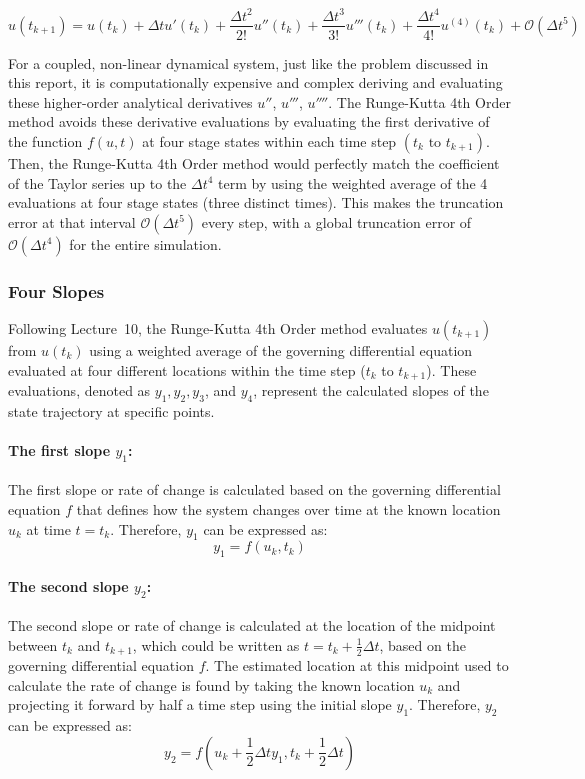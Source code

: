 \documentclass{article}
\begin{document}
\[u(t_{k+1}) = u(t_k) + \Delta t u'(t_k) + \frac{\Delta t^2}{2!} u''(t_k) + \frac{\Delta t^3}{3!} u'''(t_k) + \frac{\Delta t^4}{4!} u^{(4)}(t_k) + \mathcal{O}(\Delta t^5)\]

For a coupled, non-linear dynamical system, just like the problem discussed in this report, it is computationally expensive and complex deriving and evaluating these higher-order analytical derivatives $u''$, $u'''$, $u''''$. The Runge-Kutta 4th Order method avoids these derivative evaluations by evaluating the first derivative of the function $f(u,t)$ at four stage states within each time step $\left(t_{k} \text{ to } t_{k+1} \right)$. Then, the Runge-Kutta 4th Order method would perfectly match the coefficient of the Taylor series up to the $\Delta t^4$ term by using the weighted average of the 4 evaluations at four stage states (three distinct times). This makes the truncation error at that interval $\mathcal{O}(\Delta t^5)$ every step, with a global truncation error of $\mathcal{O}(\Delta t^4)$ for the entire simulation.

\subsubsection{Four Slopes}%
Following Lecture~10, the Runge-Kutta 4th Order method evaluates $u(t_{k+1})$ from $u(t_k)$ using a weighted average of the governing differential equation evaluated at four different locations within the time step ($t_k$ to $t_{k+1}$). These evaluations, denoted as $y_1, y_2, y_3$, and $y_4$, represent the calculated slopes of the state trajectory at specific points. 

\paragraph{The first slope $y_1$:}
The first slope or rate of change is calculated based on the governing differential equation $f$ that defines how the system changes over time at the known location $u_k$ at time $t = t_k$. Therefore, $y_1$ can be expressed as:
\[y_1 = f(u_k, t_k)\]

\paragraph{The second slope $y_2$:}
The second slope or rate of change is calculated at the location of the midpoint between $t_k$ and $t_{k+1}$, which could be written as $t = t_k + \frac{1}{2}\Delta t$, based on the governing differential equation $f$. The estimated location at this midpoint used to calculate the rate of change is found by taking the known location $u_k$ and projecting it forward by half a time step using the initial slope $y_1$. Therefore, $y_2$ can be expressed as:
\[y_2 = f\left(u_k + \frac{1}{2}\Delta t y_1, t_k + \frac{1}{2}\Delta t\right)\]
\end{document}

